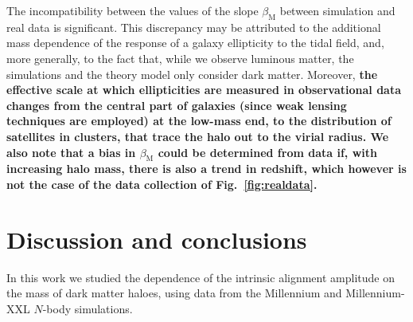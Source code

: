 \documentclass[a4paper,fleqn,usenatbib]{mnras}
\newenvironment{correction}
 {\bfseries}%
  {}%
\begin{document}
The incompatibility between the values of the slope $\beta_{\mathrm{M}}$ between simulation and real data is significant. This discrepancy may be attributed to the additional mass dependence of the response of a galaxy ellipticity to the tidal field, and, more generally, to the fact that, while we observe luminous matter, the simulations and the theory model only consider dark matter. Moreover, \begin{correction}the effective scale at which ellipticities are measured in observational data changes from the central part of galaxies (since weak lensing techniques are employed) at the low-mass end, to the distribution of satellites in clusters, that trace the halo out to the virial radius.\end{correction} We also note that a bias in $\beta_\mathrm{M}$ could be determined from data if, with increasing halo mass, there is also a trend in redshift, which however is not the case of the data collection of Fig.~\ref{fig:realdata}. 

\section{Discussion and conclusions}
In this work we studied the dependence of the intrinsic alignment amplitude on the mass of dark matter haloes, using data from the Millennium and Millennium-XXL $N$-body simulations.
\end{document}
